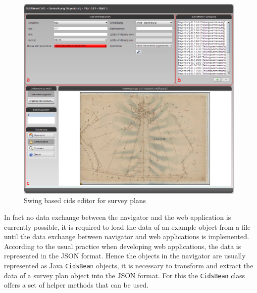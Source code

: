 \begin{figure}
	\centering	\includegraphics[width=1.0\textwidth]{./img/impl/survey_plan_editor_old.png}
	\caption{Swing based cids editor for survey plans}
	\label{fig:survey_plan_swing_editor}
\end{figure}

In fact no data exchange between the navigator and the web application is currently possible, it is required to load the data of an example object from a file until the data exchange between navigator and web applications is implemented.
According to the usual practice when developing web applications, the data is represented in the JSON format.
Hence the objects in the navigator are usually represented as Java \texttt{CidsBean} objects, it is necessary to transform and extract the data of a survey plan object into the JSON format.
For this the \texttt{CidsBean} class offers a set of helper methods that can be used.  







